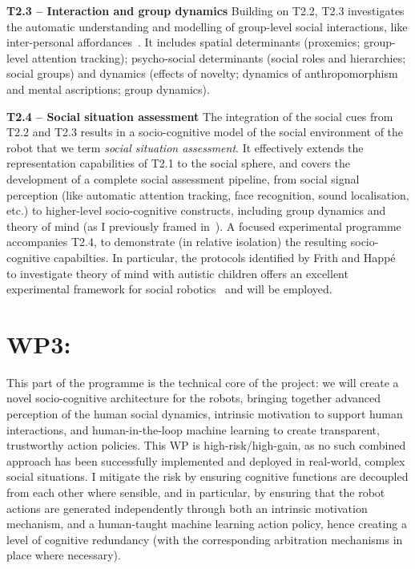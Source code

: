 \documentclass[11pt,a4paper]{report}
\begin{document}
\textbf{T2.3 -- Interaction and group dynamics} Building on T2.2, T2.3
investigates the automatic understanding and modelling of group-level social
interactions, like inter-personal affordances~\cite{pandey2013affordance}. It
includes spatial determinants (proxemics; group-level attention tracking);
psycho-social determinants (social roles and hierarchies; social groups) and
dynamics (effects of novelty; dynamics of anthropomorphism and mental
ascriptions; group dynamics). 


\textbf{T2.4 -- Social situation assessment} The integration of the social cues
from T2.2 and T2.3 results in a socio-cognitive model of the social environment
of the robot that we term \emph{social situation assessment}.  It effectively
extends the representation capabilities of T2.1 to the social sphere, and covers
the development of a complete social assessment pipeline, from social signal
perception (like automatic attention tracking, face recognition, sound
localisation, etc.) to higher-level socio-cognitive constructs, including group
dynamics and theory of mind (as I previously framed
in~\cite{lemaignan2015mutual, dillenbourg2016symmetry}). A focused experimental
programme accompanies T2.4, to demonstrate (in relative isolation) the resulting
socio-cognitive capabilties. In particular, the protocols identified by Frith
and Happé~\cite{frith1994autism} to investigate theory of mind with autistic
children offers an excellent experimental framework for social
robotics~\cite{lemaignan2015mutual} and will be employed.



\section{WP3: \textbf{\wpThree}}

\noindent{}


This part of the programme is the technical core of the project: we will create a
novel socio-cognitive architecture for the robots, bringing together advanced
perception of the human social dynamics, intrinsic motivation to support human
interactions, and human-in-the-loop machine learning to create transparent,
trustworthy action policies. This WP is high-risk/high-gain, as no such combined
approach has been successfully implemented and deployed in real-world, complex
social situations. I mitigate the risk by ensuring cognitive functions are
decoupled from each other where sensible, and in particular, by ensuring that
the robot actions are generated independently through both an intrinsic
motivation mechanism, and a human-taught machine learning action policy, hence
creating a level of cognitive redundancy (with the corresponding arbitration
mechanisms in place where necessary).
\end{document}
